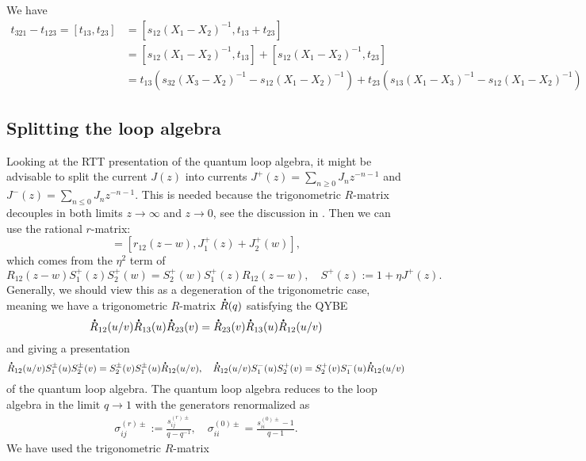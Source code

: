 \documentclass[11pt]{report}
\newcommand*{\dt}[1]{%
  \accentset{\mbox{\large\bfseries .}}{#1}}
\theoremstyle{definition}
\theoremstyle{remark}
\theoremstyle{remark}
\begin{document}
We have
\begin{align*}
t_{321}-t_{123} = [t_{13},t_{23}]
&= [s_{12}(X_1-X_2)^{-1},t_{13}+t_{23}] \\
&= [s_{12}(X_1-X_2)^{-1},t_{13}]+[s_{12}(X_1-X_2)^{-1},t_{23}] \\
&= t_{13} (s_{32} (X_3-X_2)^{-1} - s_{12}(X_1-X_2)^{-1}) + t_{23} (s_{13}(X_1-X_3)^{-1} - s_{12}(X_1-X_2)^{-1})
\end{align*}

\subsection{Splitting the loop algebra}

Looking at the RTT presentation of the quantum loop algebra, it might be advisable to split the current $J(z)$ into currents $J^+(z) = \sum_{n \geq 0} J_n z^{-n-1}$ and $J^-(z) = \sum_{n \leq 0} J_n z^{-n-1}$. This is needed because the trigonometric $R$-matrix decouples in both limits $z \to \infty$ and $z \to 0$, see the discussion in \cite{article:costello:2018b}. Then we can use the rational $r$-matrix:
\begin{equation*}
[J_1^+(z),J_2^+(w)] = [r_{12}(z-w),J_1^+(z)+J_2^+(w)],
\end{equation*}
which comes from the $\eta^2$ term of
\begin{equation*}
R_{12}(z-w) S_1^+(z) S_2^+(w) = S_2^+(w) S_1^+(z) R_{12}(z-w), \quad S^+(z) := 1 + \eta J^+(z).
\end{equation*}
Generally, we should view this as a degeneration of the trigonometric case, meaning we have a trigonometric $R$-matrix $\dt R(q)$ satisfying the QYBE
\begin{equation*}
\dt R_{12}(u/v) \dt R_{13}(u) \dt R_{23}(v) = \dt R_{23}(v) \dt R_{13}(u) \dt R_{12}(u/v)
\end{equation*}
and giving a presentation
\begin{equation*}
\dt R_{12}(u/v) S_1^\pm(u) S_2^\pm(v) = S_2^\pm(v) S_1^\pm(u) \dt R_{12}(u/v), \quad \dt R_{12}(u/v) S_1^-(u) S_2^+(v) = S_2^+(v) S_1^-(u) \dt R_{12}(u/v)
\end{equation*}
of the quantum loop algebra. The quantum loop algebra reduces to the loop algebra in the limit $q \to 1$ with the generators renormalized as
\begin{align*}
\sigma_{ij}^{(r)\pm} := \frac{s_{ij}^{(r)\pm}}{q-q^{-1}}, \quad \sigma_{ii}^{(0)\pm} = \frac{s_{ii}^{(0)\pm}-1}{q-1}.
\end{align*}
We have used the trigonometric $R$-matrix
\end{document}

